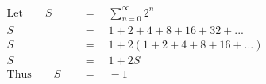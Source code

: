 \begin{align*}
\mathrm{Let}\qquad S\quad&\,=\quad\sum_{n=0}^\infty 2^n\\
S\quad&\,=\quad1+2+4+8+16+32+...\\
S\quad&\,=\quad1+2(1+2+4+8+16+...)\\
S\quad&\,=\quad1+2S\\
\mathrm{Thus}\qquad S\quad&\,=\quad-1
\end{align*}
